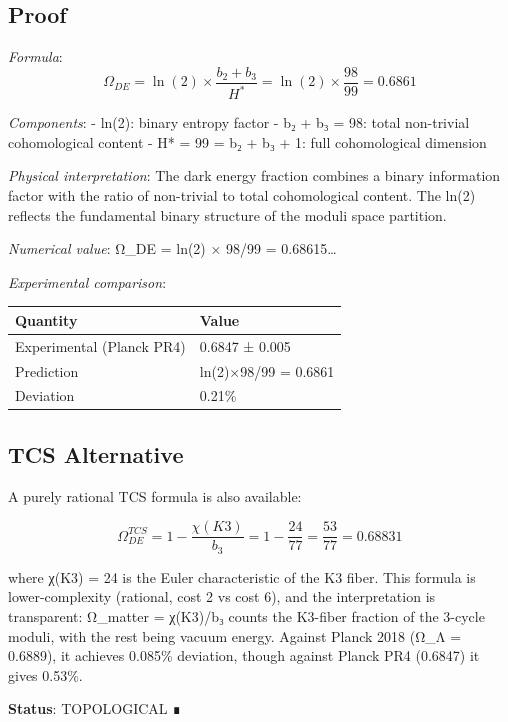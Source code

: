 \documentclass[11pt,a4paper]{article}
\begin{document}
\subsection{Proof}\label{proof-20}

\emph{Formula}: \[\Omega_{DE} = \ln(2) \times \frac{b_2 + b_3}{H^*} = \ln(2) \times \frac{98}{99} = 0.6861\]

\emph{Components}: - ln(2): binary entropy factor - b₂ + b₃ = 98: total non-trivial cohomological content - H* = 99 = b₂ + b₃ + 1: full cohomological dimension

\emph{Physical interpretation}: The dark energy fraction combines a binary information factor with the ratio of non-trivial to total cohomological content. The ln(2) reflects the fundamental binary structure of the moduli space partition.

\emph{Numerical value}: Ω\_\allowbreak{}DE = ln(2) × 98/99 = 0.68615\ldots{}

\emph{Experimental comparison}:

\begin{longtable}[]{@{}ll@{}}
\toprule\noalign{}
Quantity & Value \\
\midrule\noalign{}
\endhead
\bottomrule\noalign{}
\endlastfoot
Experimental (Planck PR4) & 0.6847 ± 0.005 \\
Prediction & ln(2)×98/99 = 0.6861 \\
Deviation & 0.21\% \\
\end{longtable}

\subsection{TCS Alternative}\label{tcs-alternative-1}

A purely rational TCS formula is also available:

\[\Omega_{DE}^{TCS} = 1 - \frac{\chi(K3)}{b_3} = 1 - \frac{24}{77} = \frac{53}{77} = 0.68831\]

where χ(K3) = 24 is the Euler characteristic of the K3 fiber. This formula is lower-complexity (rational, cost 2 vs cost 6), and the interpretation is transparent: Ω\_\allowbreak{}matter = χ(K3)/b₃ counts the K3-fiber fraction of the 3-cycle moduli, with the rest being vacuum energy. Against Planck 2018 (Ω\_\allowbreak{}Λ = 0.6889), it achieves 0.085\% deviation, though against Planck PR4 (0.6847) it gives 0.53\%.

\textbf{Status}: TOPOLOGICAL ∎
\end{document}
